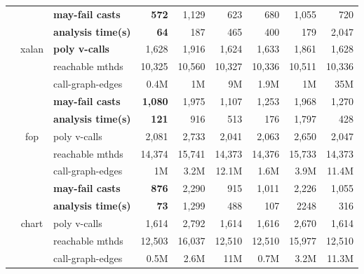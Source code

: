 \begin{table}[]
\begin{tabular}{|c| c | l |r| r r  || r | r  r |}
&\multirow{5}{*}{xalan}
                          & \textbf{may-fail casts} & \textbf{572}           & 1,129        & 623  &680 &1,055 & 720     \\
&                          & \textbf{analysis time(s)} & \textbf{64}           & 187         & 465   &400 &179 & 2,047      \\
&                          & \textbf{poly v-calls}     & 1,628        & 1,916       & 1,624  &1,633 &1,861 & 1,628     \\
&                          & reachable mthds  & 10,325       & 10,560      &10,327 &10,336 &10,511 & 10,336    \\
&                          & call-graph-edges & 0.4M         & 1M      & 9M   &1.9M &1M & 35M      \\ \cline{2-9}

&\multirow{5}{*}{fop}
                             & \textbf{may-fail casts} &\textbf{1,080}        & 1,975       & 1,107 & 1,253 & 1,968 & 1,270    \\
&                          & \textbf{analysis time(s)} & \textbf{121}         & 916     & 513    & 176 & 1,797 & 428    \\
&                          & poly v-calls                      & 2,081      & 2,733       & 2,041 & 2,063 &2,650 & 2,047    \\
&                          & reachable mthds               & 14,374     &15,741      & 14,373 & 14,376 & 15,733 & 14,373    \\
&                          & call-graph-edges             & 1M      &3.2M       & 12.1M & 1.6M & 3.9M & 11.4M    \\ \cline{2-9}

&\multirow{5}{*}{chart}
                          & \textbf{may-fail casts} &\textbf{876}        & 2,290        & 915  &1,011 &2,226 & 1,055     \\
&                          & \textbf{analysis time(s)} & \textbf{73}         & 1,299      & 488    &107 &2248 & 316     \\
&                          & poly v-calls     &1,614       & 2,792       & 1,614  &1,616 &2,670 & 1,614     \\
&                          & reachable mthds  &12,503      & 16,037      & 12,510 &12,510 &15,977 & 12,510     \\
&                          & call-graph-edges & 0.5M       & 2.6M       & 11M  & 0.7M & 3.2M & 11.3M     \\ \cline{2-9}


\end{tabular}
\end{table}
